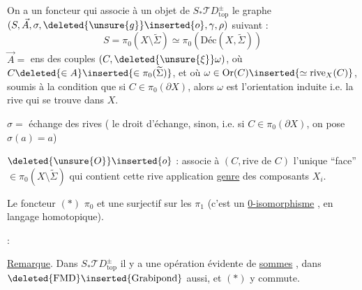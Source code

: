 On a un foncteur
qui associe à un objet  de
$S_*\mathcal TD^\pm_{\mathrm{top}}$ le graphe 
$(S,\vec A,\sigma,\deleted{\unsure{g}}\inserted{o},\gamma,\rho)$ suivant :
\[
S=\pi_0(X\setminus\widetilde\Sigma)\simeq\pi_0(\text{Déc}(X,\widetilde\Sigma))
\]
$\vec A=$ ens des couples $(C,\deleted{\unsure{\xi}}\omega)$, où
$C\deleted{\in A}\inserted{\in\pi_0(\widetilde\Sigma)}$, et où
$\omega\in\mathrm{Or}(C)\inserted{\simeq\mathrm{rive}_X(C)}$,
soumis à la condition que si $C\in\pi_0(\partial X)$, alors $\omega$
est l'orientation induite i.e. la rive qui se trouve dans $X$.

$\sigma=$ échange des rives ( le droit d'échange,
sinon, i.e. si $C\in\pi_0(\partial X)$, on pose $\sigma(a)=a$)

$\deleted{\unsure{O}}\inserted{o}$ : associe à $(C,\text{rive de }C)$
l'unique ``face'' $\in\pi_0(X\setminus\widetilde\Sigma)$ qui
contient cette rive 
application \uline{genre} des composants $X_i$.

Le foncteur $(*)$ 
 $\pi_0$ et une surjectif
sur les $\pi_1$ (c'est un \uline{0-isomorphisme} ,
en langage homotopique).

 :

\uline{Remarque}. Dans $S_*\mathcal TD^\pm_{\mathrm{top}}$ il y a une
opération évidente de \uline{sommes} ,
dans $\deleted{\mathrm{FMD}}\inserted{\mathrm{Grabipond}}$ aussi,
et $(*)$ y commute.
